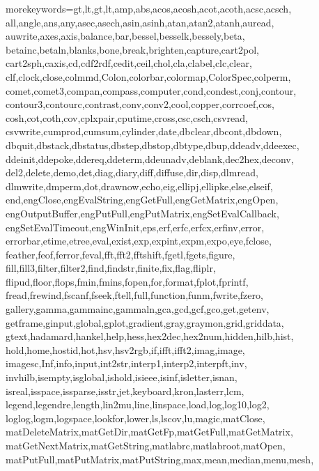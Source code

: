\RequirePackage{listings}
    {morekeywords={gt,lt,gt,lt,amp,abs,acos,acosh,acot,acoth,acsc,acsch,%
            all,angle,ans,any,asec,asech,asin,asinh,atan,atan2,atanh,auread,%
            auwrite,axes,axis,balance,bar,bessel,besselk,bessely,beta,%
            betainc,betaln,blanks,bone,break,brighten,capture,cart2pol,%
            cart2sph,caxis,cd,cdf2rdf,cedit,ceil,chol,cla,clabel,clc,clear,%
            clf,clock,close,colmmd,Colon,colorbar,colormap,ColorSpec,colperm,%
            comet,comet3,compan,compass,computer,cond,condest,conj,contour,%
            contour3,contourc,contrast,conv,conv2,cool,copper,corrcoef,cos,%
            cosh,cot,coth,cov,cplxpair,cputime,cross,csc,csch,csvread,%
            csvwrite,cumprod,cumsum,cylinder,date,dbclear,dbcont,dbdown,%
            dbquit,dbstack,dbstatus,dbstep,dbstop,dbtype,dbup,ddeadv,ddeexec,%
            ddeinit,ddepoke,ddereq,ddeterm,ddeunadv,deblank,dec2hex,deconv,%
            del2,delete,demo,det,diag,diary,diff,diffuse,dir,disp,dlmread,%
            dlmwrite,dmperm,dot,drawnow,echo,eig,ellipj,ellipke,else,elseif,%
            end,engClose,engEvalString,engGetFull,engGetMatrix,engOpen,%
            engOutputBuffer,engPutFull,engPutMatrix,engSetEvalCallback,%
            engSetEvalTimeout,engWinInit,eps,erf,erfc,erfcx,erfinv,error,%
            errorbar,etime,etree,eval,exist,exp,expint,expm,expo,eye,fclose,%
            feather,feof,ferror,feval,fft,fft2,fftshift,fgetl,fgets,figure,%
            fill,fill3,filter,filter2,find,findstr,finite,fix,flag,fliplr,%
            flipud,floor,flops,fmin,fmins,fopen,for,format,fplot,fprintf,%
            fread,frewind,fscanf,fseek,ftell,full,function,funm,fwrite,fzero,%
            gallery,gamma,gammainc,gammaln,gca,gcd,gcf,gco,get,getenv,%
            getframe,ginput,global,gplot,gradient,gray,graymon,grid,griddata,%
            gtext,hadamard,hankel,help,hess,hex2dec,hex2num,hidden,hilb,hist,%
            hold,home,hostid,hot,hsv,hsv2rgb,if,ifft,ifft2,imag,image,%
            imagesc,Inf,info,input,int2str,interp1,interp2,interpft,inv,%
            invhilb,isempty,isglobal,ishold,isieee,isinf,isletter,isnan,%
            isreal,isspace,issparse,isstr,jet,keyboard,kron,lasterr,lcm,%
            legend,legendre,length,lin2mu,line,linspace,load,log,log10,log2,%
            loglog,logm,logspace,lookfor,lower,ls,lscov,lu,magic,matClose,%
            matDeleteMatrix,matGetDir,matGetFp,matGetFull,matGetMatrix,%
            matGetNextMatrix,matGetString,matlabrc,matlabroot,matOpen,%
            matPutFull,matPutMatrix,matPutString,max,mean,median,menu,mesh,%
}}
